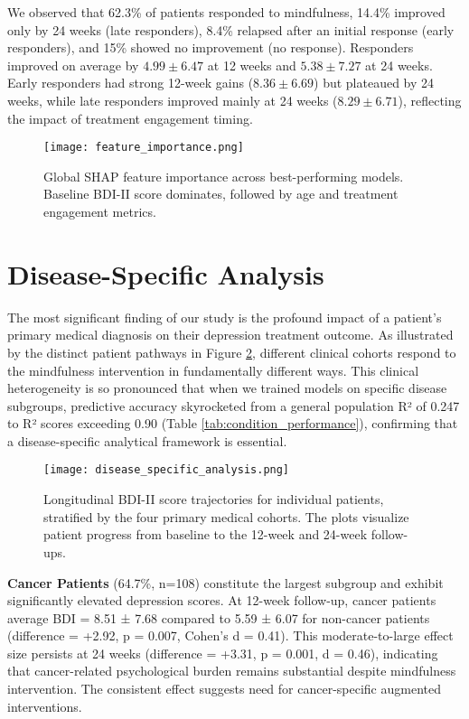\documentclass[conference]{IEEEtran}
\begin{document}
We observed that 62.3\% of patients responded to mindfulness, 14.4\% improved only by 24 weeks (late responders), 8.4\% relapsed after an initial response (early responders), and 15\% showed no improvement (no response). Responders improved on average by $4.99 \pm 6.47$ at 12 weeks and $5.38 \pm 7.27$ at 24 weeks. Early responders had strong 12-week gains ($8.36 \pm 6.69$) but plateaued by 24 weeks, while late responders improved mainly at 24 weeks ($8.29 \pm 6.71$), reflecting the impact of treatment engagement timing.


\begin{figure}[t]
\centering
\texttt{[image: feature\_importance.png]}
\caption{Global SHAP feature importance across best-performing models. Baseline BDI-II score dominates, followed by age and treatment engagement metrics.}
\label{fig:shap_global}
\end{figure}


\section{Disease-Specific Analysis}

The most significant finding of our study is the profound impact of a patient's primary medical diagnosis on their depression treatment outcome. As illustrated by the distinct patient pathways in Figure \ref{fig:disease_specific_analysis}, different clinical cohorts respond to the mindfulness intervention in fundamentally different ways. This clinical heterogeneity is so pronounced that when we trained models on specific disease subgroups, predictive accuracy skyrocketed from a general population R² of 0.247 to R² scores exceeding 0.90 (Table \ref{tab:condition_performance}), confirming that a disease-specific analytical framework is essential.


\begin{figure}[th]
    \centering
    \texttt{[image: disease\_specific\_analysis.png]}
    \caption{Longitudinal BDI-II score trajectories for individual patients, stratified by the four primary medical cohorts. The plots visualize patient progress from baseline to the 12-week and 24-week follow-ups.}
    \label{fig:disease_specific_analysis}
\end{figure}


\textbf{Cancer Patients} (64.7\%, n=108) constitute the largest subgroup and exhibit significantly elevated depression scores. At 12-week follow-up, cancer patients average BDI = 8.51 ± 7.68 compared to 5.59 ± 6.07 for non-cancer patients (difference = +2.92, p = 0.007, Cohen's d = 0.41). This moderate-to-large effect size persists at 24 weeks (difference = +3.31, p = 0.001, d = 0.46), indicating that cancer-related psychological burden remains substantial despite mindfulness intervention. The consistent effect suggests need for cancer-specific augmented interventions.
\end{document}
